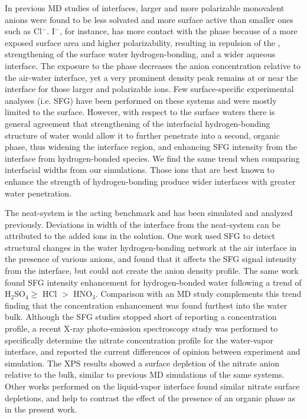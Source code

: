 In previous MD studies of \ctcwat interfaces, larger and more polarizable monovalent anions were found to be less solvated and more surface active than smaller ones such as Cl$^-$.\cite{Wick2007a} I$^-$, for instance, has more contact with the \ctc phase because of a more exposed surface area and higher polarizability, resulting in repulsion of the \ctc, strengthening of the surface water hydrogen-bonding, and a wider aqueous interface. The exposure to the \ctc phase decreases the anion concentration relative to the air-water interface, yet a very prominent density peak remains at or near the interface for those larger and polarizable ions. Few surface-specific experimental analyses (i.e. SFG) have been performed on these \ctc systems and were mostly limited to the \airwat surface. However, with respect to the surface waters there is general agreement that strengthening of the interfacial hydrogen-bonding structure of water would allow it to further penetrate into a second, organic phase, thus widening the interface region, and enhancing SFG intensity from the interface from hydrogen-bonded species. We find the same trend when comparing interfacial widths from our simulations. Those ions that are best known to enhance the strength of hydrogen-bonding produce wider interfaces with greater water penetration.

The neat-\airwat system is the acting benchmark and has been simulated and analyzed previously.\cite{Wick2006c,Hore2008,Wick2008a} Deviations in width of the interface from the neat-\ctcwat system can be attributed to the added ions in the solution. One work used SFG to detect structural changes in the water hydrogen-bonding network at the air interface in the presence of various anions, and found that it affects the SFG signal intensity from the interface, but could not create the anion density profile\cite{Schnitzer2000}. The same work found SFG intensity enhancement for hydrogen-bonded water following a trend of H$_2$SO$_4\ge$ HCl $>$ HNO$_3$. Comparison with an \airwat MD study complements this trend finding that the \sul concentration enhancement was found furthest into the water bulk.\cite{Salvador2003} Although the SFG studies stopped short of reporting a concentration profile, a recent X-ray photo-emission spectroscopy study was performed to specifically determine the nitrate concentration profile for the water-vapor interface, and reported the current differences of opinion between experiment and simulation.\cite{Brown2009} The XPS results showed a surface depletion of the nitrate anion relative to the bulk, similar to previous MD simulations of the same systems. Other works performed on the liquid-vapor interface found similar nitrate surface depletions,\cite{Otten2007} and help to contrast the effect of the presence of an organic phase as in the present work. 

